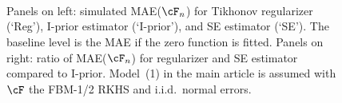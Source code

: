 \documentclass[preprint,12pt,authoryear]{elsarticle}
\begin{document}
\begin{figure}[tbp]
	\centering
	\\
	\\
	\\
	\caption{Panels on left: simulated MAE($\cF_n$) for Tikhonov regularizer (`Reg'), I-prior estimator (`I-prior'), and SE estimator (`SE'). The baseline level is the MAE if the zero function is fitted.  
		Panels on right: ratio of MAE($\cF_n$) for regularizer and SE estimator compared to I-prior.
		Model~(1) in the main article is assumed with $\cF$ the FBM-1/2 RKHS and i.i.d.\  normal errors. }
	\label{fig-sim1}
\end{figure}
\end{document}
